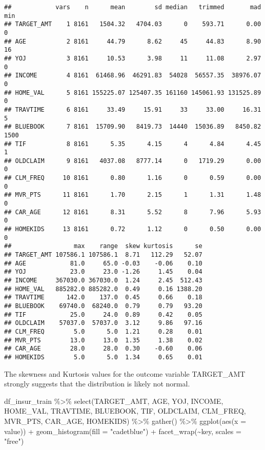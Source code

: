 \documentclass[
]{article}
\newenvironment{Shaded}{\begin{snugshade}}{\end{snugshade}}
\newcommand{\AttributeTok}[1]{\textcolor[rgb]{0.77,0.63,0.00}{#1}}
\newcommand{\FunctionTok}[1]{\textcolor[rgb]{0.00,0.00,0.00}{#1}}
\newcommand{\NormalTok}[1]{#1}
\newcommand{\SpecialCharTok}[1]{\textcolor[rgb]{0.00,0.00,0.00}{#1}}
\newcommand{\StringTok}[1]{\textcolor[rgb]{0.31,0.60,0.02}{#1}}
\begin{document}
\begin{verbatim}
##            vars    n      mean        sd median   trimmed       mad  min
## TARGET_AMT    1 8161   1504.32   4704.03      0    593.71      0.00    0
## AGE           2 8161     44.79      8.62     45     44.83      8.90   16
## YOJ           3 8161     10.53      3.98     11     11.08      2.97    0
## INCOME        4 8161  61468.96  46291.83  54028  56557.35  38976.07    0
## HOME_VAL      5 8161 155225.07 125407.35 161160 145061.93 131525.89    0
## TRAVTIME      6 8161     33.49     15.91     33     33.00     16.31    5
## BLUEBOOK      7 8161  15709.90   8419.73  14440  15036.89   8450.82 1500
## TIF           8 8161      5.35      4.15      4      4.84      4.45    1
## OLDCLAIM      9 8161   4037.08   8777.14      0   1719.29      0.00    0
## CLM_FREQ     10 8161      0.80      1.16      0      0.59      0.00    0
## MVR_PTS      11 8161      1.70      2.15      1      1.31      1.48    0
## CAR_AGE      12 8161      8.31      5.52      8      7.96      5.93    0
## HOMEKIDS     13 8161      0.72      1.12      0      0.50      0.00    0
##                 max    range  skew kurtosis      se
## TARGET_AMT 107586.1 107586.1  8.71   112.29   52.07
## AGE            81.0     65.0 -0.03    -0.06    0.10
## YOJ            23.0     23.0 -1.26     1.45    0.04
## INCOME     367030.0 367030.0  1.24     2.45  512.43
## HOME_VAL   885282.0 885282.0  0.49     0.16 1388.20
## TRAVTIME      142.0    137.0  0.45     0.66    0.18
## BLUEBOOK    69740.0  68240.0  0.79     0.79   93.20
## TIF            25.0     24.0  0.89     0.42    0.05
## OLDCLAIM    57037.0  57037.0  3.12     9.86   97.16
## CLM_FREQ        5.0      5.0  1.21     0.28    0.01
## MVR_PTS        13.0     13.0  1.35     1.38    0.02
## CAR_AGE        28.0     28.0  0.30    -0.60    0.06
## HOMEKIDS        5.0      5.0  1.34     0.65    0.01
\end{verbatim}

The skewness and Kurtosis values for the outcome variable TARGET\_AMT
strongly suggests that the distribution is likely not normal.

\begin{Shaded}
\begin{Highlighting}[]
\NormalTok{df\_insur\_train }\SpecialCharTok{\%\textgreater{}\%} 
  \FunctionTok{select}\NormalTok{(TARGET\_AMT, AGE, YOJ, INCOME, HOME\_VAL, TRAVTIME, BLUEBOOK,}
\NormalTok{         TIF, OLDCLAIM, CLM\_FREQ, MVR\_PTS, CAR\_AGE, HOMEKIDS) }\SpecialCharTok{\%\textgreater{}\%} 
  \FunctionTok{gather}\NormalTok{() }\SpecialCharTok{\%\textgreater{}\%} 
  \FunctionTok{ggplot}\NormalTok{(}\FunctionTok{aes}\NormalTok{(}\AttributeTok{x =}\NormalTok{ value)) }\SpecialCharTok{+} 
  \FunctionTok{geom\_histogram}\NormalTok{(}\AttributeTok{fill =} \StringTok{"cadetblue"}\NormalTok{) }\SpecialCharTok{+} 
  \FunctionTok{facet\_wrap}\NormalTok{(}\SpecialCharTok{\textasciitilde{}}\NormalTok{key, }\AttributeTok{scales =} \StringTok{"free"}\NormalTok{)}
\end{Highlighting}
\end{Shaded}
\end{document}
